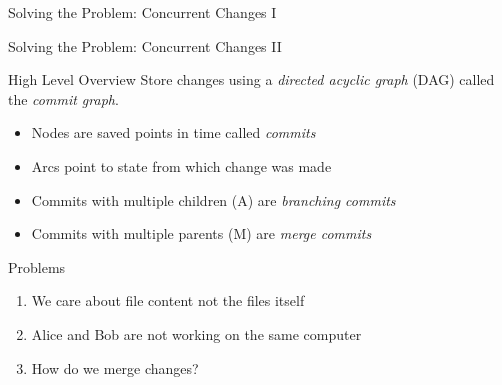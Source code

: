 \documentclass[xetex, handout]{beamer}
\begin{document}
\begin{frame}[fragile]{Solving the Problem: Concurrent Changes I}
\end{frame}

\begin{frame}{Solving the Problem: Concurrent Changes II}
  \begin{block}{High Level Overview}
    Store changes using a \emph{directed acyclic graph} (DAG) called
    the \emph{commit graph}.
    \begin{itemize}
      \item Nodes are saved points in time called \emph{commits}
      \item Arcs point to state from which change was made
      \item Commits with multiple children (A) are \emph{branching commits}
      \item Commits with multiple parents (M) are \emph{merge commits}
    \end{itemize}
  \end{block}
  \begin{alertblock}{Problems}
    \begin{enumerate}
      \item We care about file content not the files itself
      \item Alice and Bob are not working on the same computer
      \item How do we merge changes?
    \end{enumerate}
  \end{alertblock}
\end{frame}
\end{document}
